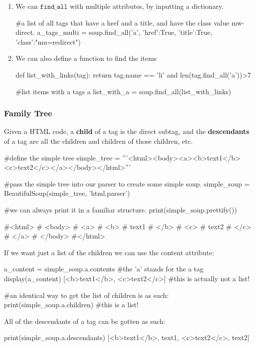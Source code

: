 \documentclass{article}
\begin{document}
\begin{definition}
\begin{enumerate}
      \item We can $\texttt{find\_all}$ with multiple attributes, by inputting a dictionary. 
      \begin{python}
      #a list of all tags that have a href and a title, and have the class value mw-direct. 
      a_tags_multi = soup.find_all('a', {'href':True, 'title':True, 'class':"mu=redirect"})
      \end{python}
      
      \item We can also define a function to find the items
      \begin{python}
      def list_with_links(tag): 
          return tag.name == 'li' and len(tag.find_all('a'))>7
          
      #list items with a tags a
      list_with_a = soup.find_all(list_with_links)
      \end{python}
  \end{enumerate}
  \end{definition}

  \subsubsection{Family Tree}
  \begin{definition}
  Given a HTML code, a \textbf{child} of a tag is the direct subtag, and the \textbf{descendants} of a tag are all the children and children of those children, etc. 
  \begin{python}
  #define the simple tree
  simple_tree = 
  '''<html><body><a><b>text1</b><c>text2</c></a></body></html>'''

  #pass the simple tree into our parser to create some simple soup. 
  simple_soup = BeautifulSoup(simple_tree, 'html.parser')

  #we can always print it in a familiar structure. 
  print(simple_soup.prettify())

  #<html>
  # <body>
  #  <a>
  #   <b>
  #    text1
  #   </b>
  #   <c>
  #    text2
  #   </c>
  #  </a>
  # </body>
  #</html>
  \end{python}
  If we want just a list of the children we can use the content attribute:
  \begin{python}
  a_content = simple_soup.a.contents  #the 'a' stands for the a tag
  display(a_content)
  [<b>text1</b>, <c>text2</c>]  #this is actually not a list!

  #an identical way to get the list of children is as such:
  print(simple_soup.a.children) #this is a list!
  \end{python}
  All of the descendants of a tag can be gotten as such: 
  \begin{python}
  print(simple_soup.a.descendants)
  [<b>text1</b>, text1, <c>text2</c>, text2]
  \end{python}
  \end{definition}
\end{document}
